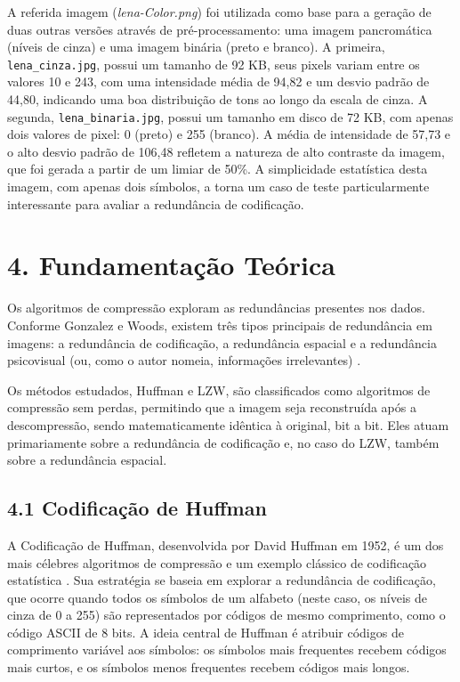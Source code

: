 \documentclass{report}
\begin{document}
A referida imagem (\textit{lena-Color.png}) foi utilizada como base para a geração de duas outras versões através de pré-processamento: uma imagem pancromática (níveis de cinza) e uma imagem binária (preto e branco). A primeira, \texttt{lena\_cinza.jpg}, possui um tamanho de 92 KB, seus pixels variam entre os valores 10 e 243, com uma intensidade média de 94,82 e um desvio padrão de 44,80, indicando uma boa distribuição de tons ao longo da escala de cinza. A segunda, \texttt{lena\_binaria.jpg}, possui um tamanho em disco de 72 KB, com apenas dois valores de pixel: 0 (preto) e 255 (branco). A média de intensidade de 57,73 e o alto desvio padrão de 106,48 refletem a natureza de alto contraste da imagem, que foi gerada a partir de um limiar de 50\%. A simplicidade estatística desta imagem, com apenas dois símbolos, a torna um caso de teste particularmente interessante para avaliar a redundância de codificação.



\section*{4. Fundamentação Teórica}

Os algoritmos de compressão exploram as redundâncias presentes nos dados. Conforme Gonzalez e Woods, existem três tipos principais de redundância em imagens: a redundância de codificação, a redundância espacial e a redundância psicovisual (ou, como o autor nomeia, informações irrelevantes) \cite{Gonzalez2010}.

Os métodos estudados, Huffman e LZW, são classificados como algoritmos de compressão sem perdas, permitindo que a imagem seja reconstruída após a descompressão, sendo matematicamente idêntica à original, bit a bit. Eles atuam primariamente sobre a redundância de codificação e, no caso do LZW, também sobre a redundância espacial.

\subsection*{4.1 Codificação de Huffman}

A Codificação de Huffman, desenvolvida por David Huffman em 1952, é um dos mais célebres algoritmos de compressão e um exemplo clássico de codificação estatística \cite{Huffman1952}. Sua estratégia se baseia em explorar a redundância de codificação, que ocorre quando todos os símbolos de um alfabeto (neste caso, os níveis de cinza de 0 a 255) são representados por códigos de mesmo comprimento, como o código ASCII de 8 bits. A ideia central de Huffman é atribuir códigos de comprimento variável aos símbolos: os símbolos mais frequentes recebem códigos mais curtos, e os símbolos menos frequentes recebem códigos mais longos.
\end{document}
